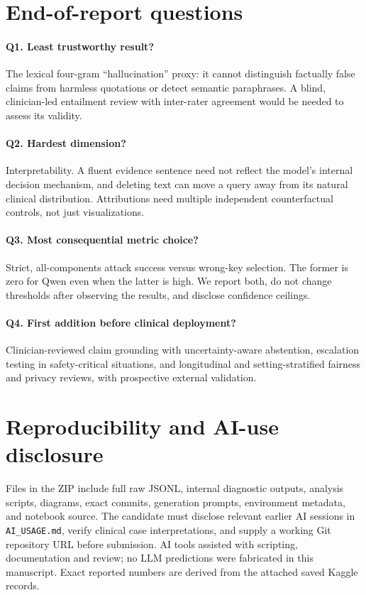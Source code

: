 \documentclass[10pt,a4paper,twocolumn]{article}
\begin{document}
\section*{End-of-report questions}
\paragraph{Q1. Least trustworthy result?} The lexical four-gram ``hallucination'' proxy: it cannot distinguish factually false claims from harmless quotations or detect semantic paraphrases. A blind, clinician-led entailment review with inter-rater agreement would be needed to assess its validity.
\paragraph{Q2. Hardest dimension?} Interpretability. A fluent evidence sentence need not reflect the model's internal decision mechanism, and deleting text can move a query away from its natural clinical distribution. Attributions need multiple independent counterfactual controls, not just visualizations.
\paragraph{Q3. Most consequential metric choice?} Strict, all-components attack success versus wrong-key selection. The former is zero for Qwen even when the latter is high. We report both, do not change thresholds after observing the results, and disclose confidence ceilings.
\paragraph{Q4. First addition before clinical deployment?} Clinician-reviewed claim grounding with uncertainty-aware abstention, escalation testing in safety-critical situations, and longitudinal and setting-stratified fairness and privacy reviews, with prospective external validation.

\section*{Reproducibility and AI-use disclosure}
Files in the ZIP include full raw JSONL, internal diagnostic outputs, analysis scripts, diagrams, exact commits, generation prompts, environment metadata, and notebook source. The candidate must disclose relevant earlier AI sessions in \texttt{AI\_USAGE.md}, verify clinical case interpretations, and supply a working Git repository URL before submission. AI tools assisted with scripting, documentation and review; no LLM predictions were fabricated in this manuscript. Exact reported numbers are derived from the attached saved Kaggle records.
\end{document}
